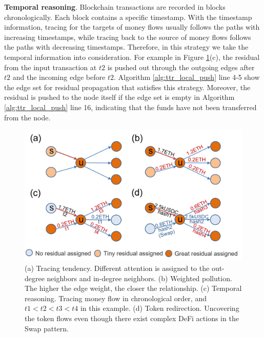 \textbf{Temporal reasoning}.
Blockchain transactions are recorded in blocks chronologically. Each block contains a specific timestamp. 
With the timestamp information, tracing for the targets of money flows usually follows the paths with increasing timestamps, while tracing back to the source of money flows follows the paths with decreasing timestamps.
Therefore, in this strategy we take the temporal information into consideration. For example in Figure \ref{fig:TTR_strategies}(c), the residual from the input transaction at $t2$ is pushed out through the outgoing edges after $t2$ and the incoming edge before $t2$. Algorithm \ref{alg:ttr_local_push} line 4-5 show the edge set for residual propagation that satisfies this strategy.
Moreover, the residual is pushed to the node itself if the edge set is empty in Algorithm \ref{alg:ttr_local_push} line 16, indicating that the funds have not been transferred from the node.

\begin{figure}[t]
    \centering
    \includegraphics[width=0.9\linewidth]{figures/TTRstrategies.png}
    \caption{(a) Tracing tendency. 
    Different attention is assigned to the out-degree neighbors and in-degree neighbors.
    (b) Weighted pollution. The higher the edge weight, the closer the relationship. 
    (c) Temporal reasoning. Tracing money flow in chronological order, and $t1<t2<t3<t4$ in this example. 
    (d) Token redirection. Uncovering the token flows even though there exist complex DeFi actions in the Swap pattern.}
    \label{fig:TTR_strategies}
\end{figure}

